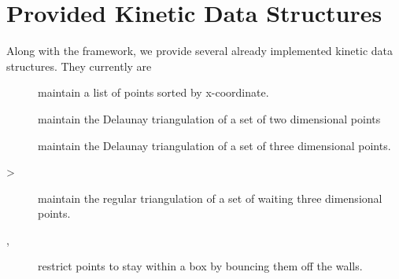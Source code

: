 \section{Provided Kinetic Data Structures}
\label{sec:provided_kdss}

Along with the framework, we provide several already implemented kinetic data structures. They currently are 
\begin{description}
\item[] maintain a list of points
sorted by x-coordinate.
\item[] maintain the Delaunay triangulation of a set of
  two dimensional points
\item[] maintain the Delaunay triangulation of a set of
  three dimensional points.
\item[>] maintain the regular triangulation of a set of waiting
three dimensional points.
\item[,
  ] restrict points to stay
  within a box by bouncing them off the walls.
\end{description}







